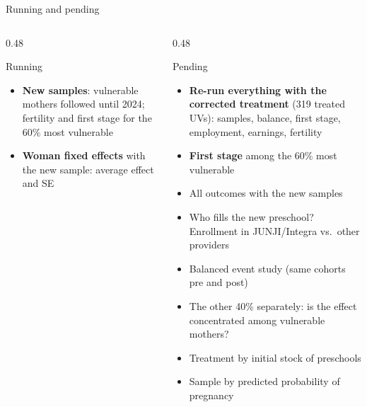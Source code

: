 \documentclass[aspectratio=169,10pt]{beamer}
\begin{document}
\begin{frame}{Running and pending}
\begin{columns}[T]
\begin{column}{0.48\textwidth}
\begin{block}{Running}
\footnotesize
\begin{itemize}
  \item \textbf{New samples}: vulnerable mothers followed until 2024; fertility and first stage for the 60\% most vulnerable
  \item \textbf{Woman fixed effects} with the new sample: average effect and SE
\end{itemize}
\end{block}
\end{column}
\begin{column}{0.48\textwidth}
\begin{block}{Pending}
\footnotesize
\begin{itemize}
  \item \textbf{Re-run everything with the corrected treatment} (319 treated UVs): samples, balance, first stage, employment, earnings, fertility
  \item \textbf{First stage} among the 60\% most vulnerable
  \item All outcomes with the new samples
  \item Who fills the new preschool? Enrollment in JUNJI/Integra vs.\ other providers
  \item Balanced event study (same cohorts pre and post)
  \item The other 40\% separately: is the effect concentrated among vulnerable mothers?
  \item Treatment by initial stock of preschools
  \item Sample by predicted probability of pregnancy
\end{itemize}
\end{block}
\end{column}
\end{columns}
\end{frame}
\end{document}
